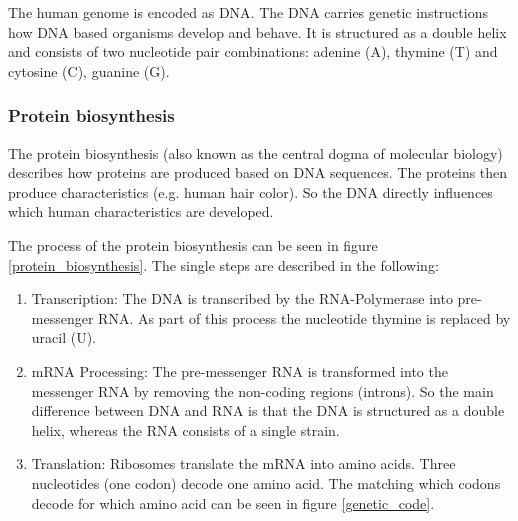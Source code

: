 The human genome is encoded as \ac{DNA}. The \ac{DNA} carries genetic instructions how \ac{DNA} based organisms develop and behave. It is structured as a double helix and consists of two nucleotide pair combinations: adenine (A), thymine (T) and cytosine (C), guanine (G). \cite[p. 8]{10.5555/1965281}


\subsubsection{Protein biosynthesis} \label{fundamentalsA0b}

The protein biosynthesis (also known as the central dogma of molecular biology) describes how proteins are produced based on \ac{DNA} sequences. The proteins then produce characteristics (e.g. human hair color). So the \ac{DNA} directly influences which human characteristics are developed.  \cite[p. 6]{schererStatisticalGeneticsGenetic2021}

The process of the protein biosynthesis can be seen in figure \ref{protein_biosynthesis}. The single steps are described in the following:
\begin{enumerate}
	\item Transcription: The \ac{DNA} is transcribed by the RNA-Polymerase into pre-messenger RNA. As part of this process the nucleotide thymine is replaced by uracil (U). \cite[p. 9]{schererStatisticalGeneticsGenetic2021}
	\item mRNA Processing: The pre-messenger RNA is transformed into the messenger RNA by removing the non-coding regions (introns). So the main difference between \ac{DNA} and \ac{RNA} is that the \ac{DNA} is structured as a double helix, whereas the \ac{RNA} consists of a single strain. \cite[p. 9]{schererStatisticalGeneticsGenetic2021}
	\item Translation: Ribosomes translate the mRNA into amino acids. Three nucleotides (one codon) decode one amino acid. The matching which codons decode for which amino acid can be seen in figure \ref{genetic_code}. \cite[p. 9]{schererStatisticalGeneticsGenetic2021}
\end{enumerate}

